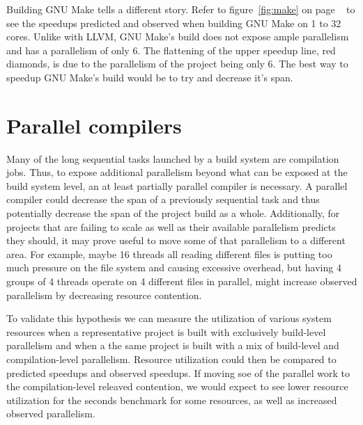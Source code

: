 \documentclass[10pt]{article}
\begin{document}
Building GNU Make tells a different story.  Refer to figure~\ref{fig:make} on page ~\pageref{fig:make}
to see the speedups predicted and observed when building GNU Make on 1 to 32 cores.  Unlike with
LLVM, GNU Make's build does not expose ample parallelism and has a parallelism of only 6.  The
flattening of the upper speedup line, red diamonds, is due to the parallelism of the project being
only 6.  The best way to speedup GNU Make's build would be to try and decrease it's span.




\section{Parallel compilers}


Many of the long sequential tasks launched by a build system are compilation jobs.  Thus, to
expose additional parallelism beyond what can be exposed at the build system level, an at least
partially parallel compiler is necessary.  A parallel compiler could decrease the span
of a previously sequential task and thus potentially decrease the span of the project build as a
whole.  Additionally, for projects that are failing to scale as well as their available parallelism
predicts they should, it may prove useful to move some of that parallelism to a different area.
For example, maybe 16 threads all reading different files is putting too much pressure on the file
system and causing excessive overhead, but having 4 groups of 4 threads operate on 4 different files
in parallel, might increase observed parallelism by decreasing resource contention.


To validate this hypothesis we can measure the utilization of various system resources when
a representative project is built with exclusively build-level parallelism and when a
the same project is built with a mix of build-level and compilation-level parallelism.  Resource utilization
could then be compared to predicted speedups and observed speedups.  If moving soe of the parallel work
to the compilation-level releaved contention, we would expect to see lower resource utilization for the
seconds benchmark for some resources, as well as increased observed parallelism.
\end{document}

